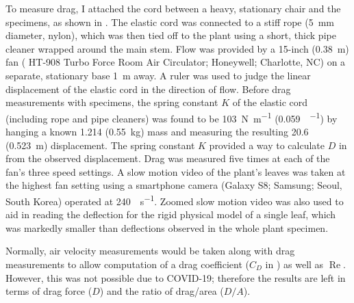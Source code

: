To measure drag, I attached the cord between a heavy, stationary chair and the specimens, as shown in . The elastic cord was connected to a stiff rope (\SI{5}{\milli\meter} diameter, nylon), which was then tied off to the plant using a short, thick pipe cleaner wrapped around the main stem. Flow was provided by a 15-inch (\SI{0.38}{\meter}) fan ( HT-908 Turbo Force Room Air Circulator; Honeywell; Charlotte, NC) on a separate, stationary base \SI{1}{\meter} away. A ruler was used to judge the linear displacement of the elastic cord in the direction of flow.  Before drag measurements with specimens, the spring constant $K$ of the elastic cord (including rope and pipe cleaners) was found to be \SI{103}{\newton\per\meter} (\SI{0.059}{\poundforce\per\inch}) by hanging a known \SI{1.214}{\pound} (\SI{0.55}{\kilo\gram}) mass and measuring the resulting \SI{20.6}{\inch} (\SI{0.523}{\meter}) displacement. The spring constant $K$ provided a way to calculate $D$ in  from the observed displacement. Drag was measured five times at each of the fan's three speed settings. A slow motion video of the plant's leaves was taken at the highest fan setting using a smartphone camera (Galaxy S8; Samsung; Seoul, South Korea) operated at \SI{240}{\frame\per\second}. Zoomed slow motion video was also used to aid in reading the deflection for the rigid physical model of a single leaf, which was markedly smaller than deflections observed in the whole plant specimen. 

Normally, air velocity measurements would be taken along with drag measurements to allow computation of a drag coefficient ($C_D$ in ) as well as $\operatorname{Re}$. However, this was not possible due to COVID-19; therefore the results are left in terms of drag force ($D$) and the ratio of drag/area ($D/A$). 

